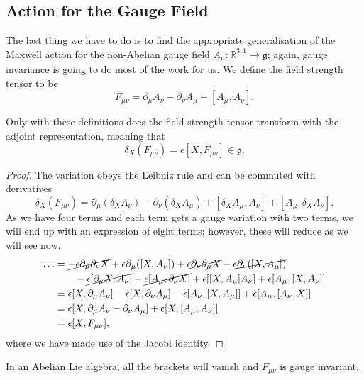 \subsection{Action for the Gauge Field}%
\label{sub:action_for_the_gauge_field}

The last thing we have to do is to find the appropriate generalisation of the Maxwell action for the non-Abelian gauge field $A_{\mu} \colon \mathbb{R}^{3, 1} \to \mathfrak{g}$; again, gauge invariance is going to do most of the work for us.
We define the field strength tensor to be
\begin{equation}
  F_{\mu\nu} = \partial_{\mu} A_{\nu} - \partial_{\nu} A_{\mu} + [A_{\mu}, A_{\nu}].
\end{equation}
\begin{claim}
  \label{cl:24-1}
  Only with these definitions does the field strength tensor transform with the adjoint representation, meaning that
  \begin{equation}
    \delta_X(F_{\mu\nu}) = \epsilon [X, F_{\mu\nu}] \in \mathfrak{g}.
  \end{equation}
\end{claim}
\begin{proof}
  The variation obeys the Leibniz rule and can be commuted with derivatives
  \begin{equation}
    \delta_X(F_{\mu\nu}) = \partial_{\mu} (\delta_X A_{\nu}) - \partial_{\nu} ( \delta_X A_{\mu}) + [\delta_X A_{\mu}, A_{\nu}] + [A_{\mu}, \delta_X A_{\nu}].
  \end{equation}
  As we have four terms and each term gets a gauge variation with two terms, we will end up with an expression of eight terms; however, these will reduce as we will see now.
  \begin{align}
    \dots &= \cancel{-\epsilon \partial_{\mu} \partial_{\nu} X} + \epsilon \partial_{\mu} ([X, A_{\nu}]) + \cancel{\epsilon \partial_{\nu} \partial_{\mu} X} - \cancel{\epsilon \partial_{\nu} ([X, A_{\mu}])} \nonumber \\ 
	  & \qquad - \cancel{\epsilon [\partial_{\mu} X, A_{\nu}]} - \cancel{\epsilon [A_{\mu}, \partial_{\nu}X]} + \epsilon [[X, A_{\mu}] A_{\nu}] + \epsilon[A_{\mu}, [X, A_{\nu}]] \\
	  &= \epsilon [X, \partial_{\mu} A_{\nu}] - \epsilon[X, \partial_{\nu} A_{\mu}] - \epsilon [A_{\nu}, [X, A_{\mu}]] + \epsilon [A_{\mu}, [A_{\nu}, X]] \\
	  &= \epsilon [X, \partial_{\mu} A_{\nu} - \partial_{\nu} A_{\mu}] + \epsilon [X, [A_{\mu}, A_{\nu}]] \\
	  &= \epsilon [X, F_{\mu\nu}],
  \end{align}
  where we have made use of the Jacobi identity.
\end{proof}
\begin{corollary}
  In an Abelian Lie algebra, all the brackets will vanish and $F_{\mu\nu}$ is gauge invariant.
\end{corollary}

